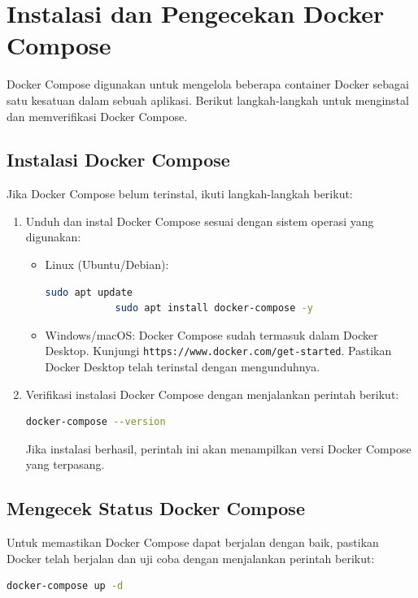 \section{Instalasi dan Pengecekan Docker Compose}

Docker Compose digunakan untuk mengelola beberapa container Docker sebagai satu kesatuan dalam sebuah aplikasi. Berikut langkah-langkah untuk menginstal dan memverifikasi Docker Compose.

\subsection{Instalasi Docker Compose}

Jika Docker Compose belum terinstal, ikuti langkah-langkah berikut:

\begin{enumerate}
	\item Unduh dan instal Docker Compose sesuai dengan sistem operasi yang digunakan:
	\begin{itemize}
		\item Linux (Ubuntu/Debian):
		\begin{lstlisting}[language=bash]
			sudo apt update
			sudo apt install docker-compose -y
		\end{lstlisting}
		
		\item Windows/macOS: Docker Compose sudah termasuk dalam Docker Desktop. Kunjungi \texttt{https://www.docker.com/get-started}. Pastikan Docker Desktop telah terinstal dengan mengunduhnya.
	\end{itemize}
	
	\item Verifikasi instalasi Docker Compose dengan menjalankan perintah berikut:
	\begin{lstlisting}[language=bash]
		docker-compose --version
	\end{lstlisting}
	Jika instalasi berhasil, perintah ini akan menampilkan versi Docker Compose yang terpasang.
\end{enumerate}

\subsection{Mengecek Status Docker Compose}

Untuk memastikan Docker Compose dapat berjalan dengan baik, pastikan Docker telah berjalan dan uji coba dengan menjalankan perintah berikut:

\begin{lstlisting}[language=bash]
	docker-compose up -d
\end{lstlisting}

